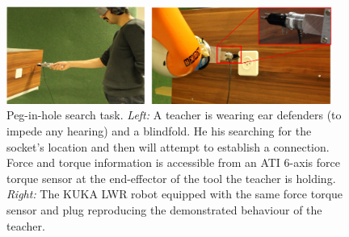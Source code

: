 \begin{figure}[h]
  \centering
  \includegraphics[width=0.95\textwidth]{./ch4-PiH/Figures/Fig/human_example_search.pdf}
  \caption{Peg-in-hole search task. \textit{Left:} A teacher is wearing ear defenders (to impede any hearing) and 
  a blindfold. He his searching for the socket's location and then will attempt to establish a connection. Force 
  and torque information is accessible from an ATI 6-axis force torque sensor at the end-effector of the tool the teacher is holding.
  \textit{Right:} The KUKA LWR robot equipped with the same force torque sensor and plug reproducing the demonstrated behaviour of the 
  teacher.}
  \label{fig:experiment_setup}
\end{figure}



